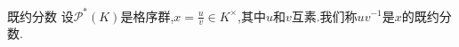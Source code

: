 \begin{definition}{既约分数}{}
	设$\mathscr{P}^{\ast}\left(K\right)$是格序群,$x=\frac{u}{v}\in K^{\times}$,其中$u$和$v$互素.我们称$uv^{-1}$是$x$的既约分数.
\end{definition}






